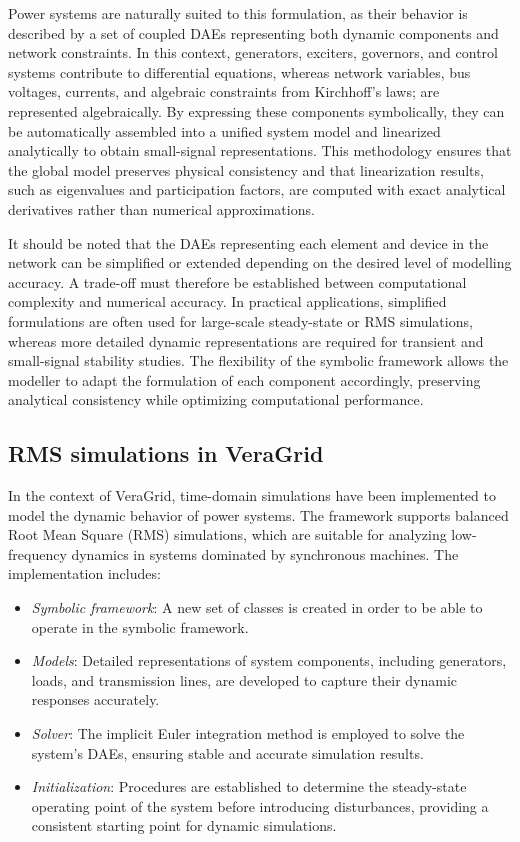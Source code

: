 Power systems are naturally suited to this formulation, as their behavior is described by a set of coupled DAEs representing both dynamic components and network constraints.
In this context, generators, exciters, governors, and control systems contribute to differential equations, whereas network variables, bus voltages, currents, and algebraic 
constraints from Kirchhoff's laws; are represented algebraically. By expressing these components symbolically, they can be automatically assembled into a unified 
system model and linearized analytically to obtain small-signal representations. This methodology ensures that the global model preserves physical consistency and that 
linearization results, such as eigenvalues and participation factors, are computed with exact analytical derivatives rather than numerical approximations.

It should be noted that the DAEs representing each element and device in the network can be simplified or extended depending on the desired level of modelling accuracy. 
A trade-off must therefore be established between computational complexity and numerical accuracy. In practical applications, simplified formulations are often used for 
large-scale steady-state or RMS simulations, whereas more detailed dynamic representations are required for transient and small-signal stability studies. The flexibility 
of the symbolic framework allows the modeller to adapt the formulation of each component accordingly, preserving analytical consistency while optimizing computational 
performance.

\subsection{RMS simulations in VeraGrid}

In the context of VeraGrid, time-domain simulations have been implemented to model the dynamic behavior of power systems.
The framework supports balanced Root Mean Square (RMS) simulations, which are suitable for analyzing low-frequency dynamics in systems dominated by synchronous machines.
The implementation includes:

\begin{itemize}
    \item \textit{Symbolic framework}: A new set of classes is created in order to be able to operate in the symbolic framework.
    \item \textit{Models}: Detailed representations of system components, including generators, loads, and transmission lines, are developed to capture their dynamic
    responses accurately.
    \item \textit{Solver}: The implicit Euler integration method is employed to solve the system's DAEs, ensuring stable and accurate simulation results.
    \item \textit{Initialization}: Procedures are established to determine the steady-state operating point of the system before introducing disturbances,
    providing a consistent starting point for dynamic simulations.
\end{itemize}

